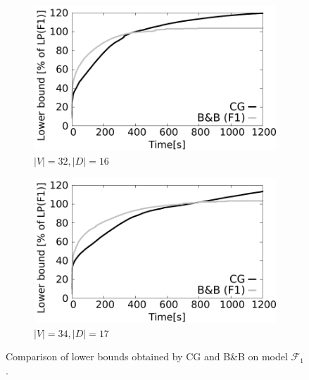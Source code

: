 \begin{figure}[!htb]
    \begin{subfigure}[b]{0.49\textwidth}
        \includegraphics[width=\textwidth]{lower-bound-32-16}
        \caption{$|V|=32, |D|=16$}
        \label{fig:cggr32-16}
    \end{subfigure}
    \hfill %
    \begin{subfigure}[b]{0.49\textwidth}
        \includegraphics[width=\textwidth]{lower-bound-34-17}
        \caption{$|V|=34, |D|=17$}
        \label{fig:cggr34-17}
    \end{subfigure}
  \caption{Comparison of lower bounds obtained by CG and B\&B on model $\mathcal{F}_1$. }
  \label{fig:cggr}
\end{figure} 

